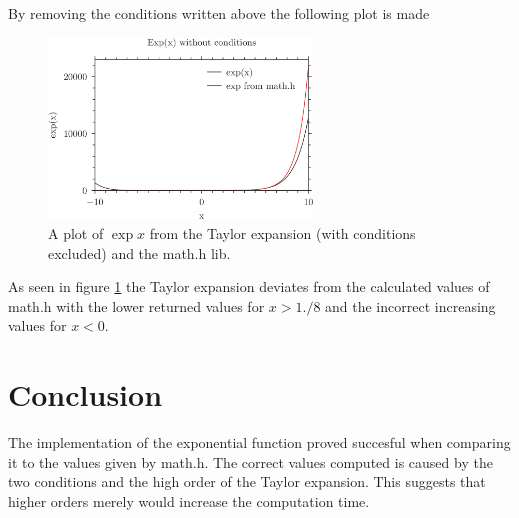 \documentclass{article}
\begin{document}
By removing the conditions written above the following plot is made
\begin{figure}[h!]
    \centering
    \includegraphics[width=70mm]{exp_wrong.png}
    \caption{A plot of $\exp{x}$ from the Taylor expansion (with conditions excluded) and the math.h lib.}
    \label{TaylorPlot_wrong}
\end{figure}
As seen in figure \ref{TaylorPlot_wrong} the Taylor expansion deviates from the calculated values of math.h with the lower returned values for $x>1./8$ and the incorrect increasing values for $x<0$.
\section*{Conclusion}
The implementation of the exponential function proved succesful when comparing it to the values given by math.h. The correct values computed is caused by the two conditions and the high order of the Taylor expansion. This suggests that higher orders merely would increase the computation time. 
\end{document}
